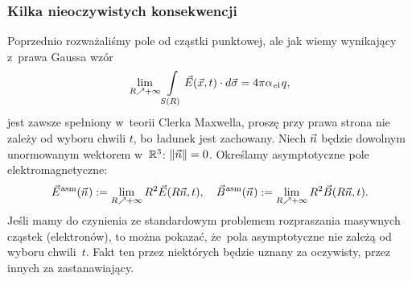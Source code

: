 \documentclass[10pt,t]{beamer}
\begin{document}
\begin{frame}
  \frametitle{Kilka nieoczywistych konsekwencji}


  Poprzednio rozważaliśmy pole od cząstki punktowej, ale jak wiemy
  wynikający z~prawa Gaussa wzór
  \begin{equation}
    \label{eq:Glowne-rodzaje-problemow-podczerwonych-08}
    \lim_{ R \nearrow +\infty } \int\limits_{ S( R ) } \vec{E}( \vec{x}, t ) \cdot d\vec{ \sigma } =
    4 \pi \alpha_{ \hspace{0.09em} \text{el} } \hspace{0.09em} q,
  \end{equation}
  jest zawsze spełniony w~teorii Clerka Maxwella, proszę przy prawa strona
  nie zależy od wyboru chwili $t$, bo ładunek jest zachowany. Niech $\vec{n}$
  będzie dowolnym unormowanym wektorem w~$\mathbb{R}^{ 3 }$: $\Vert \vec{n} \Vert = 0$.
  Określamy asymptotyczne pole elektromagnetyczne:
  \begin{equation}
    \label{eq:Glowne-rodzaje-problemow-podczerwonych-09}
    \vec{E}^{ \hspace{0.05em} \text{asm} }( \vec{n} \hspace{0.05em} ) :=
    \lim_{ R \nearrow +\infty } R^{ 2 } \vec{E}( R \vec{n}, t ), \quad
    \vec{B}^{ \hspace{0.05em} \text{asm} }( \vec{n} \hspace{0.05em} ) :=
    \lim_{ R \nearrow +\infty } R^{ 2 } \vec{B}( R \vec{n}, t ).
  \end{equation}
  Jeśli mamy do czynienia ze standardowym problemem rozpraszania masywnych
  cząstek (elektronów), to można pokazać, że~pola asymptotyczne nie zależą
  od wyboru chwili~$t$. Fakt ten przez niektórych będzie uznany za
  oczywisty, przez innych za zastanawiający.

\end{frame}
\end{document}
